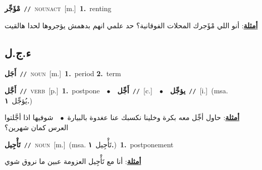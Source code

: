 \documentclass[10pt,a4paper,twoside]{article} %
\begin{document}
\begin{multicols}{2}
{\setlength\topsep{0pt}\textbf{\foreignlanguage{arabic}{مْؤَجِّر}}\ {\color{gray}\texttt{//}\color{black}}\ \textsc{noun\textunderscore act}\ [m.]\ \textbf{1.}~renting\  \begin{flushright}\color{gray}\foreignlanguage{arabic}{\textbf{\underline{\foreignlanguage{arabic}{أمثلة}}}: أنو اللي مْؤَجرك المحلات الفوقانية؟ حد علمي انهم بدهمش يؤجروها لحدا هالقيت}\end{flushright}\color{black}} \vspace{2mm}

\vspace{-3mm}
\subsection*{\color{blue}\foreignlanguage{arabic}{ء.ج.ل}\color{blue}{}} 

{\setlength\topsep{0pt}\textbf{\foreignlanguage{arabic}{أَجَل}}\ {\color{gray}\texttt{//}\color{black}}\ \textsc{noun}\ [m.]\ \textbf{1.}~period  \textbf{2.}~term\ } \vspace{2mm}

{\setlength\topsep{0pt}\textbf{\foreignlanguage{arabic}{أَجَّل}}\ {\color{gray}\texttt{//}\color{black}}\ \textsc{verb}\ [p.]\ \textbf{1.}~postpone\ \ $\bullet$\ \ \setlength\topsep{0pt}\textbf{\foreignlanguage{arabic}{أَجِّل}}\ {\color{gray}\texttt{//}\color{black}}\ [c.]\ \ $\bullet$\ \ \setlength\topsep{0pt}\textbf{\foreignlanguage{arabic}{يؤجِّل}}\ {\color{gray}\texttt{//}\color{black}}\ [i.]\ \color{gray}(msa. \foreignlanguage{arabic}{يُؤجِّل}~\foreignlanguage{arabic}{\textbf{١.}})\color{black}\  \begin{flushright}\color{gray}\foreignlanguage{arabic}{\textbf{\underline{\foreignlanguage{arabic}{أمثلة}}}: حاول أجِّل معه بكرة وخلينا نكسبك عنا عغدوة بالبيارة\ $\bullet$\ \  شوفيها اذا أجَّلتوا العرس كمان شهرين؟}\end{flushright}\color{black}} \vspace{2mm}

{\setlength\topsep{0pt}\textbf{\foreignlanguage{arabic}{تَأْجِيل}}\ {\color{gray}\texttt{//}\color{black}}\ \textsc{noun}\ [m.]\ \color{gray}(msa. \foreignlanguage{arabic}{تَأْجِيل}~\foreignlanguage{arabic}{\textbf{١.}})\color{black}\ \textbf{1.}~postponement\  \begin{flushright}\color{gray}\foreignlanguage{arabic}{\textbf{\underline{\foreignlanguage{arabic}{أمثلة}}}: أنا مع تَأْجِيل العزومة عبين ما نروق شوي}\end{flushright}\color{black}} \vspace{2mm}


\end{multicols}
\end{document}
